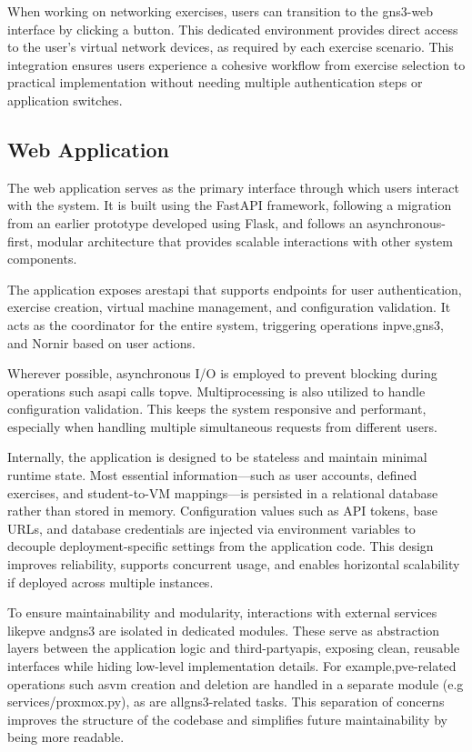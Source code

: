         When working on networking exercises, users can transition to the \ac{gns3}-web interface by clicking a button. This dedicated environment 
        provides direct access to the user's virtual network devices, as required by each exercise scenario. This integration ensures users experience 
        a cohesive workflow from exercise selection to practical implementation without needing multiple authentication steps or application switches.

    \subsection{Web Application}

        The web application serves as the primary interface through which users interact with the system. It is built using the FastAPI 
        framework, following a migration from an earlier prototype developed using Flask, and follows an asynchronous-first, modular 
        architecture that provides scalable interactions with other system components.

        The application exposes a\ac{rest}\ac{api} that supports endpoints for user authentication, exercise creation, virtual 
        machine management, and configuration validation. It acts as the coordinator for the entire system, triggering operations 
        in\ac{pve},\ac{gns3}, and Nornir based on user actions.

        Wherever possible, asynchronous I/O is employed to prevent blocking during operations such as\ac{api} calls to\ac{pve}.
        Multiprocessing is also utilized to handle configuration validation. This keeps the system responsive and performant, 
        especially when handling multiple simultaneous requests from different users.

        Internally, the application is designed to be stateless and maintain minimal runtime state.  Most essential information—such 
        as user accounts, defined exercises, and student-to-VM mappings—is persisted in a relational database rather than stored in 
        memory. Configuration values such as API tokens, base URLs, and database credentials are injected via environment variables 
        to decouple deployment-specific settings from the application code. This design improves reliability, supports concurrent 
        usage, and enables horizontal scalability if deployed across multiple instances. 

        To ensure maintainability and modularity, interactions with external services like\ac{pve} and\ac{gns3} are isolated in 
        dedicated modules. These serve as abstraction layers between the application logic and third-party\ac{api}s, exposing clean, 
        reusable interfaces while hiding low-level implementation details. For example,\ac{pve}-related operations such as\ac{vm} 
        creation and deletion are handled in a separate module (e.g services/proxmox.py), as are all\ac{gns3}-related tasks. This 
        separation of concerns improves the structure of the codebase and simplifies future maintainability by being more readable.

